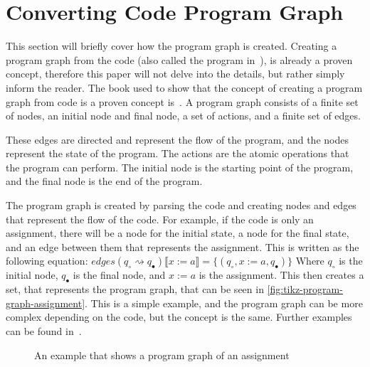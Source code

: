\section{Converting Code Program Graph}
This section will briefly cover how the program graph is created.
Creating a program graph from the code (also called the program in~\cite{nielson_formal_2019}), is already a proven concept, therefore this paper will not delve into the details, but rather simply inform the reader.
The book used to show that the concept of creating a program graph from code is a proven concept is~\cite[see][chap 2.2]{nielson_formal_2019}.
A program graph consists of a finite set of nodes, an initial node and final node, a set of actions, and a finite set of edges.

These edges are directed and represent the flow of the program, and the nodes represent the state of the program. The actions are the atomic operations that the program can perform. The initial node is the starting point of the program, and the final node is the end of the program.

The program graph is created by parsing the code and creating nodes and edges that represent the flow of the code. For example, if the code is only an assignment, there will be a node for the initial state, a node for the final state, and an edge between them that represents the assignment. This is written as the following equation:
$edges(q_{\circ} \rightsquigarrow q_{\bullet})\llbracket x:=a \rrbracket = \{(q_{\circ}, x:=a, q_{\bullet})\}$
Where $q_{\circ}$ is the initial node, $q_{\bullet}$ is the final node, and $x:=a$ is the assignment. This then creates a set, that represents the program graph, that can be seen in \autoref{fig:tikz-program-graph-assignment}. This is a simple example, and the program graph can be more complex depending on the code, but the concept is the same.
Further examples can be found in~\cite[Figure 2.6]{nielson_formal_2019}.

\begin{figure}[htb!]
    \center
    
    \caption{An example that shows a program graph of an assignment}
    \label{fig:tikz-program-graph-assignment}
\end{figure}